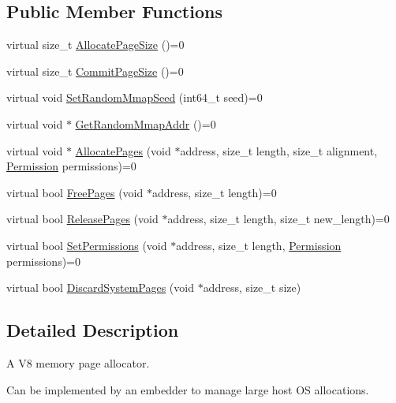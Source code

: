 \subsection*{Public Member Functions}
\begin{DoxyCompactItemize}
\item 
virtual size\+\_\+t \mbox{\hyperlink{classv8_1_1PageAllocator_a92c2f6dbb3afa6c47dafd4c12ab4641f}{Allocate\+Page\+Size}} ()=0
\item 
virtual size\+\_\+t \mbox{\hyperlink{classv8_1_1PageAllocator_ad817d87004151e3824997415f2dc57e9}{Commit\+Page\+Size}} ()=0
\item 
virtual void \mbox{\hyperlink{classv8_1_1PageAllocator_a9481a73527915fd200f6e1e9ed4b3eba}{Set\+Random\+Mmap\+Seed}} (int64\+\_\+t seed)=0
\item 
virtual void $\ast$ \mbox{\hyperlink{classv8_1_1PageAllocator_a37f194f9c5fdbe5105476cbd1432418c}{Get\+Random\+Mmap\+Addr}} ()=0
\item 
virtual void $\ast$ \mbox{\hyperlink{classv8_1_1PageAllocator_ab3a25ddd2601701f80ee67c4bf017ef7}{Allocate\+Pages}} (void $\ast$address, size\+\_\+t length, size\+\_\+t alignment, \mbox{\hyperlink{classv8_1_1PageAllocator_a88f74b164fe97e053259f67a95758415}{Permission}} permissions)=0
\item 
virtual bool \mbox{\hyperlink{classv8_1_1PageAllocator_abc2e3fdc768aba7d35ce0cf44f14586c}{Free\+Pages}} (void $\ast$address, size\+\_\+t length)=0
\item 
virtual bool \mbox{\hyperlink{classv8_1_1PageAllocator_a6eb6bd93c8880dd022a61a13c65f66c0}{Release\+Pages}} (void $\ast$address, size\+\_\+t length, size\+\_\+t new\+\_\+length)=0
\item 
virtual bool \mbox{\hyperlink{classv8_1_1PageAllocator_aa3817d5bfaba9ec280a6cfb60e6adda0}{Set\+Permissions}} (void $\ast$address, size\+\_\+t length, \mbox{\hyperlink{classv8_1_1PageAllocator_a88f74b164fe97e053259f67a95758415}{Permission}} permissions)=0
\item 
virtual bool \mbox{\hyperlink{classv8_1_1PageAllocator_ad0de847c922e25f63d82494d997f441d}{Discard\+System\+Pages}} (void $\ast$address, size\+\_\+t size)
\end{DoxyCompactItemize}


\subsection{Detailed Description}
A V8 memory page allocator.

Can be implemented by an embedder to manage large host OS allocations. 

